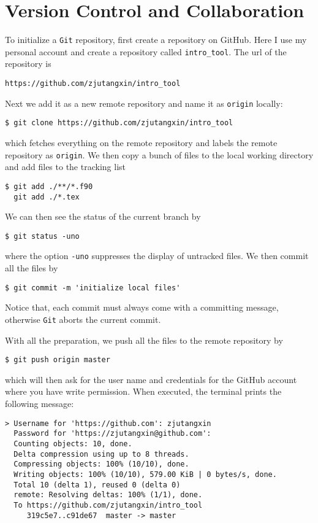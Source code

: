 \documentclass[twoside,11pt,leqno]{article}
\newcommand{\code}{\texttt}
\begin{document}
\section{Version Control and Collaboration}

To initialize a \code{Git} repository, first create a repository on GitHub. Here I use my personal account and create a repository called \code{intro\_tool}. The url of the repository is
{\color{blue}\begin{verbatim}
https://github.com/zjutangxin/intro_tool
\end{verbatim}}
\noindent Next we add it as a new remote repository and name it as \code{origin} locally:
\begin{verbatim}
$ git clone https://github.com/zjutangxin/intro_tool
\end{verbatim}
which fetches everything on the remote repository and labels the remote repository as \code{origin}. We then copy a bunch of files to the local working directory and add files to the tracking list
\begin{verbatim}
$ git add ./**/*.f90
  git add ./*.tex
\end{verbatim}
We can then see the status of the current branch by
\begin{verbatim}
$ git status -uno
\end{verbatim}
where the option \code{-uno} suppresses the display of untracked files. We then commit all the files by
\begin{verbatim}
$ git commit -m 'initialize local files'
\end{verbatim}
Notice that, each commit must always come with a committing message, otherwise \code{Git} aborts the current commit.

With all the preparation, we push all the files to the remote repository by
\begin{verbatim}
$ git push origin master
\end{verbatim}
which will then ask for the user name and credentials for the GitHub account where you have write permission. When executed, the terminal prints the following message:
\begin{verbatim}
> Username for 'https://github.com': zjutangxin
  Password for 'https://zjutangxin@github.com':
  Counting objects: 10, done.
  Delta compression using up to 8 threads.
  Compressing objects: 100% (10/10), done.
  Writing objects: 100% (10/10), 579.00 KiB | 0 bytes/s, done.
  Total 10 (delta 1), reused 0 (delta 0)
  remote: Resolving deltas: 100% (1/1), done.
  To https://github.com/zjutangxin/intro_tool
     319c5e7..c91de67  master -> master
\end{verbatim}
\end{document}
